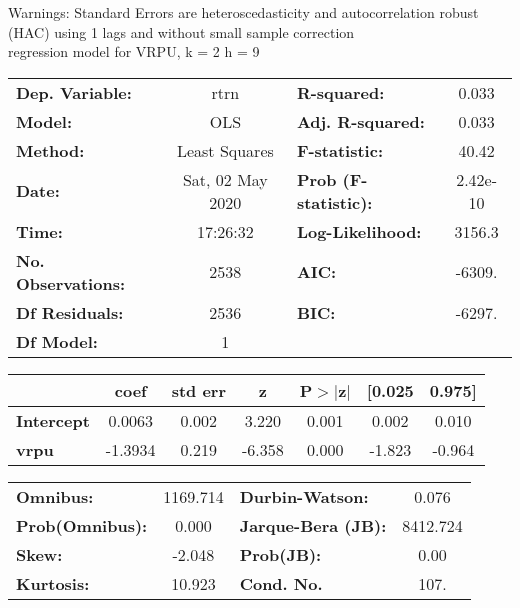 Warnings: \newline
 [1] Standard Errors are heteroscedasticity and autocorrelation robust (HAC) using 1 lags and without small sample correction\\ 

regression model for VRPU, k = 2 h = 9\begin{center}
\begin{tabular}{lclc}
\toprule
\textbf{Dep. Variable:}    &       rtrn       & \textbf{  R-squared:         } &     0.033   \\
\textbf{Model:}            &       OLS        & \textbf{  Adj. R-squared:    } &     0.033   \\
\textbf{Method:}           &  Least Squares   & \textbf{  F-statistic:       } &     40.42   \\
\textbf{Date:}             & Sat, 02 May 2020 & \textbf{  Prob (F-statistic):} &  2.42e-10   \\
\textbf{Time:}             &     17:26:32     & \textbf{  Log-Likelihood:    } &    3156.3   \\
\textbf{No. Observations:} &        2538      & \textbf{  AIC:               } &    -6309.   \\
\textbf{Df Residuals:}     &        2536      & \textbf{  BIC:               } &    -6297.   \\
\textbf{Df Model:}         &           1      & \textbf{                     } &             \\
\bottomrule
\end{tabular}
\begin{tabular}{lcccccc}
                   & \textbf{coef} & \textbf{std err} & \textbf{z} & \textbf{P$> |$z$|$} & \textbf{[0.025} & \textbf{0.975]}  \\
\midrule
\textbf{Intercept} &       0.0063  &        0.002     &     3.220  &         0.001        &        0.002    &        0.010     \\
\textbf{vrpu}      &      -1.3934  &        0.219     &    -6.358  &         0.000        &       -1.823    &       -0.964     \\
\bottomrule
\end{tabular}
\begin{tabular}{lclc}
\textbf{Omnibus:}       & 1169.714 & \textbf{  Durbin-Watson:     } &    0.076  \\
\textbf{Prob(Omnibus):} &   0.000  & \textbf{  Jarque-Bera (JB):  } & 8412.724  \\
\textbf{Skew:}          &  -2.048  & \textbf{  Prob(JB):          } &     0.00  \\
\textbf{Kurtosis:}      &  10.923  & \textbf{  Cond. No.          } &     107.  \\
\bottomrule
\end{tabular}
\end{center}

